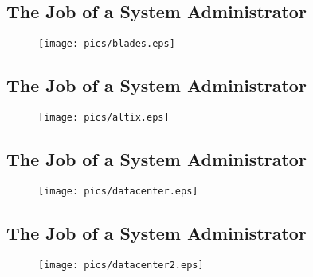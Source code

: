 \documentclass[xga]{xdvislides}
\begin{document}
\subsection{The Job of a System Administrator}
\vspace*{\fill}
\begin{figure}[hb]
	\begin{center}
		\texttt{[image: pics/blades.eps]} \\
	\end{center}
\end{figure}
\vspace*{\fill}

\subsection{The Job of a System Administrator}
\vspace*{\fill}
\begin{figure}[hb]
	\begin{center}
		\texttt{[image: pics/altix.eps]} \\
	\end{center}
\end{figure}
\vspace*{\fill}

\subsection{The Job of a System Administrator}
\vspace*{\fill}
\begin{figure}[hb]
	\begin{center}
		\texttt{[image: pics/datacenter.eps]} \\
	\end{center}
\end{figure}
\vspace*{\fill}

\subsection{The Job of a System Administrator}
\vspace*{\fill}
\begin{figure}[hb]
	\begin{center}
		\texttt{[image: pics/datacenter2.eps]} \\
	\end{center}
\end{figure}
\vspace*{\fill}
\end{document}
